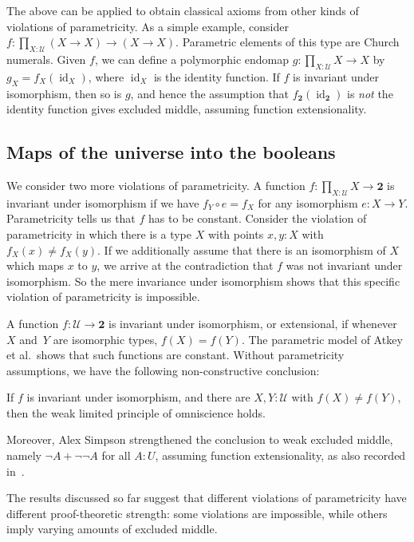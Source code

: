 \documentclass[a4paper,UKenglish]{lipics-v2016}
\newcommand{\comp}{\mathrel{\circ}}
\newcommand{\UU}{\mathcal{U}}
\newcommand{\bool}{\mathbf{2}}
\newcommand{\idfunc}[1][]{\operatorname{id}_{#1}}
\begin{document}
The above can be applied to obtain classical axioms from
other kinds of violations of parametricity.  As a simple example,
consider $f:\prod_{X : \UU} (X \to X) \to (X \to X)$.  Parametric
elements of this type are Church numerals.
%
Given $f$, we can define a polymorphic endomap
$g:\prod_{X : \UU} X \to X$ by $g_X=f_X(\idfunc[X])$, where
$\idfunc[X]$ is the identity function.  If $f$ is invariant under
isomorphism, then so is $g$, and hence the assumption that
$f_\bool(\idfunc[\bool])$ is \emph{not} the identity function gives
excluded middle, assuming function extensionality.

\subsection{Maps of the universe into the booleans}

We consider two more violations of parametricity.
A function $f:\prod_{X : \UU} X \to \bool$ is invariant under
isomorphism if we have $f_Y \comp e = f_X$ for any isomorphism
$e:X\to Y$.  Parametricity tells us that $f$ has to be constant.
Consider the violation of parametricity in which there is a type $X$
with points $x,y:X$ with $f_X(x) \neq f_X(y)$.  If we additionally
assume that there is an isomorphism of $X$ which maps $x$ to $y$, we
arrive at the contradiction that $f$ was not invariant under
isomorphism.  So the mere invariance under isomorphism shows that this
specific violation of parametricity is impossible.

A function $f : \UU \to \bool$ is invariant under
isomorphism, or extensional, if whenever $X$ and~$Y$ are isomorphic
types, $f(X)=f(Y)$.  The parametric model of Atkey et al.\ shows that
such functions are constant. Without parametricity assumptions, we
have the following non-constructive conclusion:
\begin{theorem}
  If $f$ is invariant under isomorphism, and there are $X,Y:\UU$ with
  $f(X) \neq f(Y)$, then the weak limited principle of omniscience
  holds.
\end{theorem}
Moreover, Alex Simpson strengthened the conclusion to weak excluded
middle, namely $\neg A + \neg\neg A$ for all $A : U$, assuming
function extensionality, as also recorded
in~\cite{DBLP:journals/apal/EscardoS16}.

The results discussed so far suggest that different violations of
parametricity have different proof-theoretic strength: some violations
are impossible, while others imply varying amounts of excluded middle.
\end{document}

